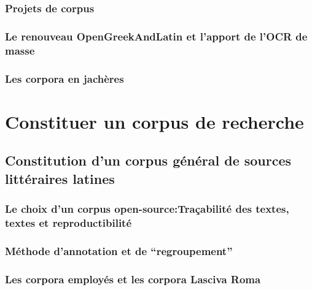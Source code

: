 
\subsubsection{ Projets de corpus }


\subsubsection{Le renouveau OpenGreekAndLatin et l’apport de l’OCR de masse}

\subsubsection{Les corpora en jachères}


\section{Constituer un corpus de recherche}

\subsection{Constitution d’un corpus général de sources littéraires latines}

\subsubsection{Le choix d’un corpus open-source:Traçabilité des textes, textes et reproductibilité}


\subsubsection{Méthode d’annotation et de “regroupement”}


\subsubsection{Les corpora employés et les corpora Lasciva Roma}

